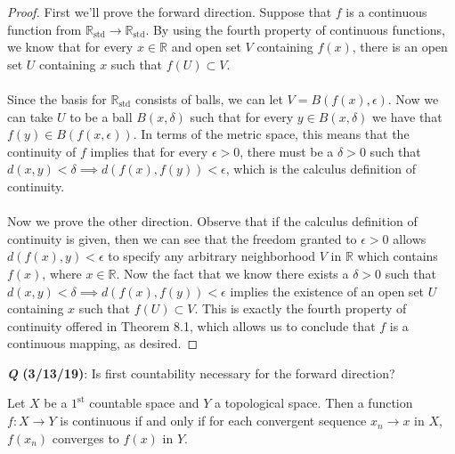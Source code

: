 \documentclass[letter,12pt,twoside]{hmcpset}
\begin{document}
\begin{proof}
    First we'll prove the forward direction. Suppose that $f$ is a continuous
    function from $\mathbb{R}_{\text{std}} \rightarrow \mathbb{R}_{\text{std}}$.
    By using the fourth property of continuous functions, we know that for every
    $x \in \mathbb{R}$ and open set $V$ containing $f(x)$, there is an open set 
    $U$ containing $x$ such that $f(U) \subset V$. 
    \\
    \\
    Since the basis for
    $\mathbb{R}_\text{std}$ consists of balls, we can let $V = B(f(x),
    \epsilon)$. Now we can take $U$ to be a ball $B(x, \delta)$ such that 
    for every $y \in B(x, \delta)$ we have that $f(y) \in B(f(x, \epsilon))$.
    In terms of the metric space, this means that the continuity of $f$ implies 
    that for every $\epsilon > 0$, there must be a $\delta > 0$ such that 
    $d(x, y) < \delta \implies d(f(x), f(y)) < \epsilon$, which is the calculus
    definition of continuity.
    \\
    \\
    Now we prove the other direction. Observe that if the calculus definition of
    continuity is given, then we can see that the freedom granted to $\epsilon >
    0$ allows $d(f(x), y) < \epsilon$ to specify any arbitrary neighborhood
    $V$ in $\mathbb{R}$ which contains $f(x)$, where $x \in \mathbb{R}$.
    Now the fact that we know there exists a $\delta > 0$ such that 
    $d(x, y) < \delta \implies d(f(x), f(y)) < \epsilon$ implies the existence
    of an open set $U$ containing $x$ such that $f(U) \subset V$. This is exactly
    the fourth property of continuity offered in Theorem 8.1, which allows us to
    conclude that $f$ is a continuous mapping, as desired.
\end{proof}
\textbf{\emph{Q} (3/13/19)}: Is first countability necessary for the forward direction?\\
\begin{problem}[Theorem 8.6]
    Let $X$ be a $1^{\text{st}}$ countable space and $Y$ a topological space.
    Then a function $f: X \rightarrow Y$ is continuous if  and only if for 
    each convergent sequence $x_n \rightarrow x$ in $X$, $f(x_n)$
    converges to $f(x)$ in $Y$.
\end{problem}
\end{document}
